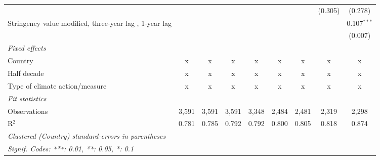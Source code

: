 \begin{table}[htbp]
\begin{tabular}{lcccccccc}
                                                                                                        &                &               &               &               &               &               & (0.305)       & (0.278)\\   
      Stringency value modified, three-year lag , 1-year lag                                            &                &               &               &               &               &               &               & 0.107$^{***}$\\   
                                                                                                        &                &               &               &               &               &               &               & (0.007)\\   
      \emph{Fixed effects}\\
      Country                                                                                           & x              & x             & x             & x             & x             & x             & x             & x\\  
      Half decade                                                                                       & x              & x             & x             & x             & x             & x             & x             & x\\  
      Type of climate action/measure                                                                    & x              & x             & x             & x             & x             & x             & x             & x\\  
      \midrule \emph{Fit statistics}\\
      Observations                                                                                      & 3,591          & 3,591         & 3,591         & 3,348         & 2,484         & 2,481         & 2,319         & 2,298\\  
      R$^2$                                                                                             & 0.781          & 0.785         & 0.792         & 0.792         & 0.800         & 0.805         & 0.818         & 0.874\\  
      \midrule
      \multicolumn{9}{l}{\emph{Clustered (Country) standard-errors in parentheses}}\\
      \multicolumn{9}{l}{\emph{Signif. Codes: ***: 0.01, **: 0.05, *: 0.1}}\\
   \end{tabular}
\end{table}


